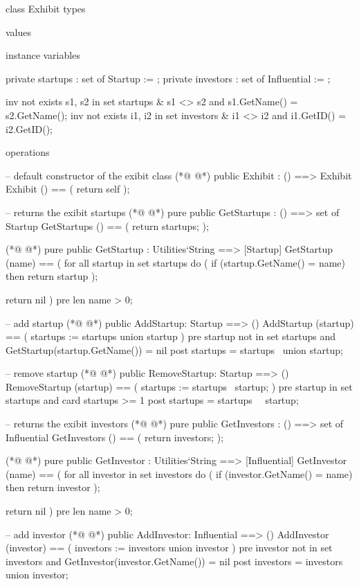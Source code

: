 \begin{vdmpp}[breaklines=true]
class Exhibit
types

values

instance variables

 private startups : set of Startup := {};
 private investors : set of Influential := {};
 
 inv not exists s1, s2 in set startups & s1 <> s2 and s1.GetName() = s2.GetName();
 inv not exists i1, i2 in set investors & i1 <> i2 and i1.GetID() = i2.GetID();
 
operations

  -- default constructor of the exibit class 
(*@
\label{Exhibit:17}
@*)
 public Exhibit : () ==> Exhibit
  Exhibit () == (
    return self
   );
    
 -- returns the exibit startups
(*@
\label{GetStartups:23}
@*)
 pure public GetStartups : () ==> set of Startup
   GetStartups () == (
    return startups;
   );
   
(*@
\label{GetStartup:28}
@*)
  pure public GetStartup : Utilities`String ==> [Startup]
   GetStartup (name) == (
    for all startup in set startups do (
     if (startup.GetName() = name)
      then return startup
     );
     
     return nil
    )
    pre len name > 0; 
   
 -- add startup
(*@
\label{AddStartup:40}
@*)
 public AddStartup: Startup ==> ()
  AddStartup (startup) == (
    startups := startups union {startup}
   )
   pre startup not in set startups and GetStartup(startup.GetName()) = nil
   post startups = startups~ union {startup};  
 
 -- remove startup
(*@
\label{RemoveStartup:48}
@*)
 public RemoveStartup: Startup ==> ()
   RemoveStartup (startup) == (
    startups := startups \ {startup};
   )
   pre startup in set startups and card startups >= 1
  post startups = startups~ \ {startup};
 
 -- returns the exibit investors
(*@
\label{GetInvestors:56}
@*)
 pure public GetInvestors : () ==> set of Influential
  GetInvestors () == (
    return investors;
   );
 
(*@
\label{GetInvestor:61}
@*)
 pure public GetInvestor : Utilities`String ==> [Influential]
   GetInvestor (name) == (
    for all investor in set investors do (
     if (investor.GetName() = name)
      then return investor
     );
     
     return nil
    )
    pre len name > 0; 
 
 -- add investor
(*@
\label{AddInvestor:73}
@*)
 public AddInvestor: Influential ==> ()
  AddInvestor (investor) == (
    investors := investors union {investor}
   )
   pre investor not in set investors and GetInvestor(investor.GetName()) = nil
   post investors = investors~ union {investor};  
    

\end{vdmpp}
